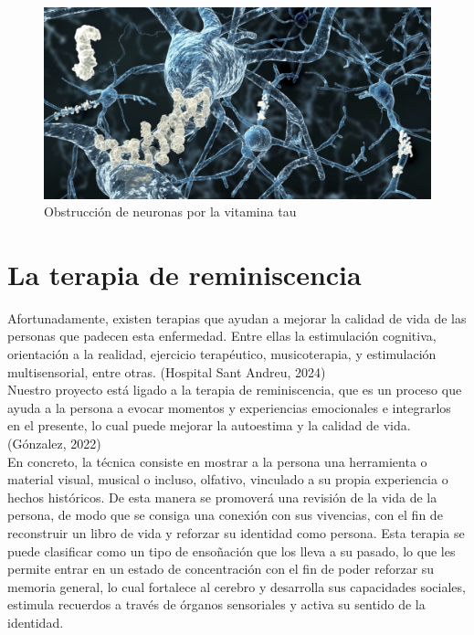 \begin{figure}[h]
	\centering
	\includegraphics[width = 1 \textwidth]{Imagenes/Vectorial/proteina-tau.jpg}
	\caption{Obstrucción de neuronas por la vitamina tau}
	\label{fig:tau}
\end{figure}


\section{La terapia de reminiscencia}

Afortunadamente, existen terapias que ayudan a mejorar la calidad de vida de las personas que padecen esta enfermedad. Entre ellas la estimulación cognitiva, orientación a la realidad, ejercicio terapéutico, musicoterapia, y estimulación multisensorial, entre otras. (Hospital Sant Andreu, 2024)\\

Nuestro proyecto está ligado a la terapia de reminiscencia, que es un proceso que ayuda a la persona a evocar momentos y experiencias emocionales e integrarlos en el presente, lo cual puede mejorar la autoestima y la calidad de vida.(Gónzalez, 2022)\\

En concreto, la técnica consiste en mostrar a la persona una herramienta o material visual, musical o incluso, olfativo, vinculado a su propia experiencia o hechos históricos. De esta manera se promoverá una revisión de la vida de la persona, de modo que se consiga una conexión con sus vivencias, con el fin de reconstruir un libro de vida y reforzar su identidad como persona.  Esta terapia se puede clasificar como un tipo de ensoñación que los lleva a su pasado, lo que les permite entrar en un estado de concentración con el fin de poder reforzar su memoria general, lo cual fortalece al cerebro y desarrolla sus capacidades sociales, estimula recuerdos a través de órganos sensoriales y activa su sentido de la identidad.\\

